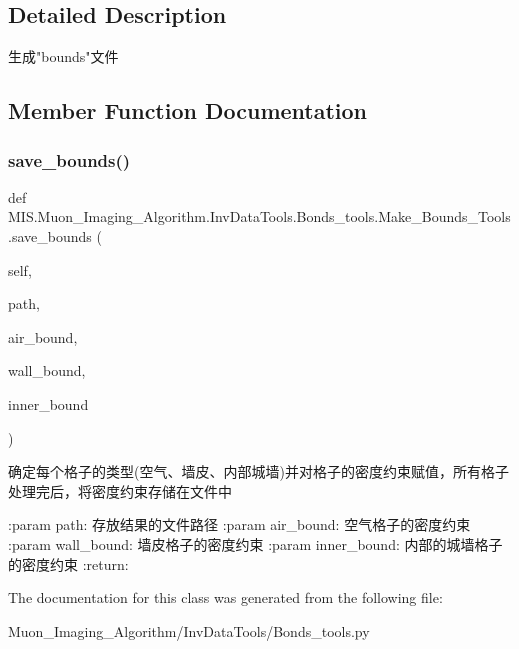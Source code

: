\subsection{Detailed Description}
\begin{DoxyVerb}生成"bounds"文件\end{DoxyVerb}
 

\subsection{Member Function Documentation}
\mbox{\label{classMIS_1_1Muon__Imaging__Algorithm_1_1InvDataTools_1_1Bonds__tools_1_1Make__Bounds__Tools_a89e5090986235149c04dbeeb25756ad2}} 
\subsubsection{\texorpdfstring{save\+\_\+bounds()}{save\_bounds()}}
{\footnotesize\ttfamily def M\+I\+S.\+Muon\+\_\+\+Imaging\+\_\+\+Algorithm.\+Inv\+Data\+Tools.\+Bonds\+\_\+tools.\+Make\+\_\+\+Bounds\+\_\+\+Tools.\+save\+\_\+bounds (\begin{DoxyParamCaption}\item[{}]{self,  }\item[{}]{path,  }\item[{}]{air\+\_\+bound,  }\item[{}]{wall\+\_\+bound,  }\item[{}]{inner\+\_\+bound }\end{DoxyParamCaption})}

\begin{DoxyVerb}确定每个格子的类型(空气、墙皮、内部城墙)并对格子的密度约束赋值，所有格子处理完后，将密度约束存储在文件中

:param path: 存放结果的文件路径
:param air_bound: 空气格子的密度约束
:param wall_bound: 墙皮格子的密度约束
:param inner_bound: 内部的城墙格子的密度约束
:return:
\end{DoxyVerb}
 

The documentation for this class was generated from the following file\+:\begin{DoxyCompactItemize}
\item 
Muon\+\_\+\+Imaging\+\_\+\+Algorithm/\+Inv\+Data\+Tools/Bonds\+\_\+tools.\+py\end{DoxyCompactItemize}
